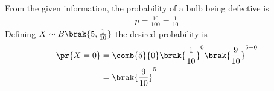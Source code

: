 From the given information, the probability of a bulb being defective is
\begin{align}
p = \frac{10}{100} = \frac{1}{10}
\end{align}
%
Defining $X \sim B \brak{5,\frac{1}{10}}$  the desired probability is
\begin{align}
    \pr{X=0} &= \comb{5}{0} \brak{\frac{1}{10}}^{0} \brak{\frac{9}{10}} ^ {5-0}\\
    &= \brak{\frac{9}{10}}^5
\end{align}
